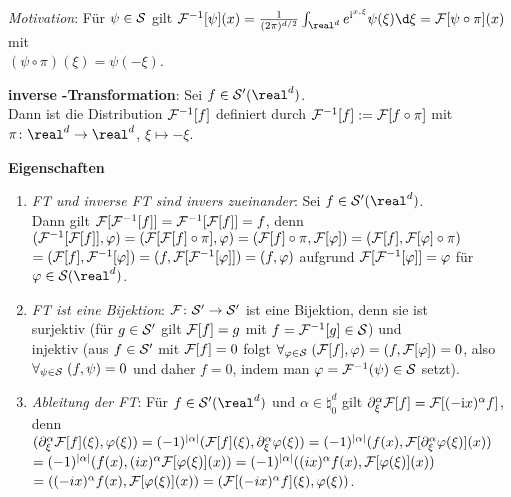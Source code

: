 \linie

\emph{Motivation}:
Für $\psi \in \S$ gilt $\F^{-1}[\psi](x) =
\frac{1}{(2\pi)^{d/2}} \int_{\real^d} e^{\i\sp{x, \xi}}\psi(\xi)\d\xi =
\F[\psi \circ \pi](x)$ mit\\
$(\psi \circ \pi)(\xi) = \psi(-\xi)$.

\textbf{inverse -Transformation}:
Sei $f \in \S'(\real^d)$.\\
Dann ist die Distribution $\F^{-1}[f]$ definiert durch
$\F^{-1}[f] := \F[f \circ \pi]$ mit $\pi\colon \real^d \rightarrow \real^d$,
$\xi \mapsto -\xi$.

\linie

\textbf{Eigenschaften}
\begin{enumerate}
    \item
    \emph{FT und inverse FT sind invers zueinander}:
    Sei $f \in \S'(\real^d)$.\\
    Dann gilt $\F[\F^{-1}[f]] = \F^{-1}[\F[f]] = f$, denn\\
    $(\F^{-1}[\F[f]], \varphi) =
    (\F[\F[f] \circ \pi], \varphi) =
    (\F[f] \circ \pi, \F[\varphi]) =
    (\F[f], \F[\varphi] \circ \pi)$\\
    $= (\F[f], \F^{-1}[\varphi]) =
    (f, \F[\F^{-1}[\varphi]]) =
    (f, \varphi)$
    aufgrund $\F[\F^{-1}[\varphi]] = \varphi$ für $\varphi \in \S(\real^d)$.

    \item
    \emph{FT ist eine Bijektion}:
    $\F\colon \S' \rightarrow \S'$ ist eine Bijektion, denn sie ist\\
    surjektiv
    (für $g \in \S'$ gilt $\F[f] = g$ mit $f = \F^{-1}[g] \in \S$) und\\
    injektiv
    (aus $f \in \S'$ mit $\F[f] = 0$ folgt
    $\forall_{\varphi \in \S}\; (\F[f], \varphi) = (f, \F[\varphi]) = 0$,
    also\\
    $\forall_{\psi \in \S}\; (f, \psi) = 0$ und daher $f = 0$,
    indem man $\varphi = \F^{-1}(\psi) \in \S$ setzt).

    \item
    \emph{Ableitung der FT}:
    Für $f \in \S'(\real^d)$ und $\alpha \in \natural_0^d$ gilt
    $\partial_\xi^\alpha \F[f] = \F[(-\i x)^\alpha f]$, denn\\
    $(\partial_\xi^\alpha \F[f](\xi), \varphi(\xi)) =
    (-1)^{|\alpha|} (\F[f](\xi), \partial_\xi^\alpha \varphi(\xi)) =
    (-1)^{|\alpha|} (f(x), \F[\partial_\xi^\alpha \varphi(\xi)](x))$\\
    $= (-1)^{|\alpha|} (f(x), (ix)^\alpha \F[\varphi(\xi)](x)) =
    (-1)^{|\alpha|} ((ix)^\alpha f(x), \F[\varphi(\xi)](x))$\\
    $= ((-ix)^\alpha f(x), \F[\varphi(\xi)](x)) =
    (\F[(-ix)^\alpha f](\xi), \varphi(\xi))$.


\end{enumerate}
